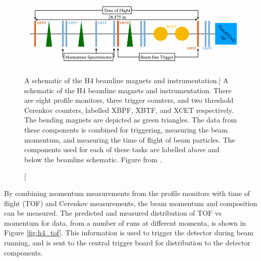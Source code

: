 \begin{figure}

	\centering

	\includegraphics[width=\textwidth]{figures/h4_schem.pdf}

	\caption
	[A schematic of the H4 beamline magnets and instrumentation.]
	{A schematic of the H4 beamline magnets and instrumentation. There are eight
	profile monitors, three trigger counters, and two threshold Cerenkov counters,
	labelled XBPF, XBTF, and XCET respectively. The bending magnets are depicted
	as green triangles. The data from these components is combined for triggering,
	measuring the beam momentum, and measuring the time of flight of beam
	particles. The components used for each of these tasks are labelled above and
	below the beamline schematic. Figure from \cite{protoduneperf}.}

	\label{fig:h4_schem}

\end{figure}

By combining momentum measurements from the profile monitors with time of flight
(TOF) and Cerenkov measurements, the beam momentum and composition can be 
measured. The predicted and measured distribution of TOF vs momentum for data,
from a number of runs at different momenta, is shown in Figure \ref{fig:h4_tof}.
This information is used to trigger the detector during beam running, and is
sent to the central trigger board for distribution to the detector components.

